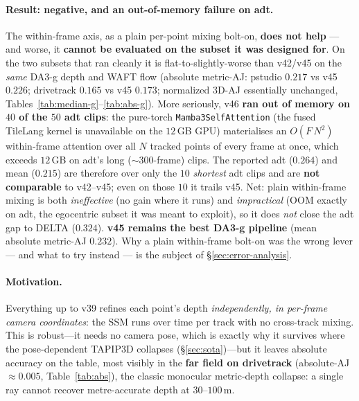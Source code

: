 \documentclass[11pt,a4paper]{article}
\begin{document}
\paragraph{Result: negative, and an out-of-memory failure on adt.}
The within-frame axis, as a plain per-point mixing bolt-on, \textbf{does not help} --- and worse, it
\textbf{cannot be evaluated on the subset it was designed for}. On the two subsets that ran cleanly it is
flat-to-slightly-worse than v42/v45 on the \emph{same} DA3-g depth and WAFT flow (absolute metric-AJ:
pstudio $0.217$ vs v45 $0.226$; drivetrack $0.165$ vs v45 $0.173$; normalized 3D-AJ essentially unchanged,
Tables~\ref{tab:median-g}--\ref{tab:abs-g}). More seriously, v46 \textbf{ran out of memory on $40$ of the
$50$ adt clips}: the pure-torch \texttt{Mamba3SelfAttention} (the fused TileLang kernel is unavailable on the
$12$\,GB GPU) materialises an $O(F\,N^{2})$ within-frame attention over all $N$ tracked points of every frame
at once, which exceeds $12$\,GB on adt's long ($\sim$300-frame) clips. The reported adt ($0.264$) and mean
($0.215$) are therefore over only the $10$ \emph{shortest} adt clips and are \textbf{not comparable} to
v42--v45; even on those $10$ it trails v45. Net: plain within-frame mixing is both \emph{ineffective} (no
gain where it runs) and \emph{impractical} (OOM exactly on adt, the egocentric subset it was meant to
exploit), so it does \emph{not} close the adt gap to DELTA ($0.324$). \textbf{v45 remains the best DA3-g
pipeline} (mean absolute metric-AJ $0.232$). Why a plain within-frame bolt-on was the wrong lever --- and
what to try instead --- is the subject of \S\ref{sec:error-analysis}.

\paragraph{Motivation.}
Everything up to v39 refines each point's depth \emph{independently, in per-frame camera coordinates}: the
SSM runs over time per track with no cross-track mixing. This is robust---it needs no camera pose, which is
exactly why it survives where the pose-dependent TAPIP3D collapses (\S\ref{sec:sota})---but it leaves
absolute accuracy on the table, most visibly in the \textbf{far field on drivetrack} (absolute-AJ
$\approx0.005$, Table~\ref{tab:abs}), the classic monocular metric-depth collapse: a single ray cannot
recover metre-accurate depth at $30$--$100$\,m.
\end{document}
